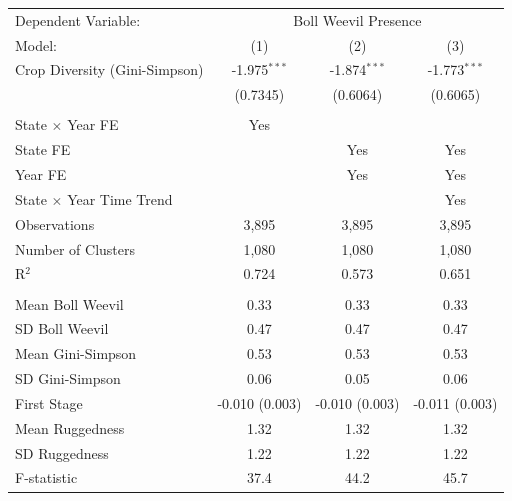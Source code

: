 \begingroup
\centering
\begin{tabular}{lccc}
   \toprule \toprule
   Dependent Variable: & \multicolumn{3}{c}{Boll Weevil Presence} \\
   Model: & (1) & (2) & (3) \\
   \midrule
  Crop Diversity (Gini-Simpson) & -1.975$^{***}$ & -1.874$^{***}$ & -1.773$^{***}$ \\
  & (0.7345) & (0.6064) & (0.6065) \\
   & & & \\
   State $\times$ Year FE                 & Yes &  &  \\
      State FE                 &  & Yes  & Yes \\
      Year FE                 &  & Yes  &  Yes\\
      State $\times$ Year Time Trend                 &  &   &  Yes\\

   \midrule
  Observations & 3,895 & 3,895 & 3,895 \\
  Number of Clusters & 1,080 & 1,080 & 1,080 \\
  R$^2$ & 0.724 & 0.573 & 0.651 \\
   & & & \\
  Mean Boll Weevil & 0.33 & 0.33 & 0.33 \\
  SD Boll Weevil & 0.47 & 0.47 & 0.47 \\
  Mean Gini-Simpson & 0.53 & 0.53 & 0.53 \\
  SD Gini-Simpson & 0.06 & 0.05 & 0.06 \\

   \midrule
  First Stage & -0.010 (0.003) & -0.010 (0.003) & -0.011 (0.003) \\
  Mean Ruggedness & 1.32 & 1.32 & 1.32 \\
  SD Ruggedness & 1.22 & 1.22 & 1.22 \\
  F-statistic & 37.4 & 44.2 & 45.7 \\
   \bottomrule \bottomrule
\end{tabular}
\par\endgroup
